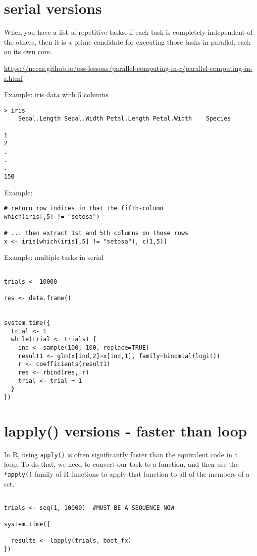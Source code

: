 \section{serial versions}


When you have a list of repetitive tasks, if each task is completely independent
of the others, then it is a prime candidate for executing those tasks in
parallel, each on its own core.

\url{https://nceas.github.io/oss-lessons/parallel-computing-in-r/parallel-computing-in-r.html}

Example: iris data with 5 columns
\begin{verbatim}
> iris
    Sepal.Length Sepal.Width Petal.Length Petal.Width    Species

1
2
.
.
.
150
\end{verbatim}

Example:
\begin{verbatim}
# return row indices in that the fifth-column
which(iris[,5] != "setosa")

# ... then extract 1st and 5th columns on those rows
x <- iris[which(iris[,5] != "setosa"), c(1,5)]

\end{verbatim}


Example: multiple tasks in serial
\begin{verbatim}

trials <- 10000

res <- data.frame()


system.time({
  trial <- 1
  while(trial <= trials) {
    ind <- sample(100, 100, replace=TRUE)
    result1 <- glm(x[ind,2]~x[ind,1], family=binomial(logit))
    r <- coefficients(result1)
    res <- rbind(res, r)
    trial <- trial + 1
  }
})
\end{verbatim}

\section{lapply() versions - faster than loop}

In R, using \verb!apply()! is often significantly faster than the equivalent
code in a loop. To do that, we need to convert our task to a function, and then
use the \verb!*apply()! family of R functions to apply that function to all of
the members of a set.
\begin{verbatim}

trials <- seq(1, 10000)  #MUST BE A SEQUENCE NOW

system.time({

  results <- lapply(trials, boot_fx)
})

\end{verbatim}

